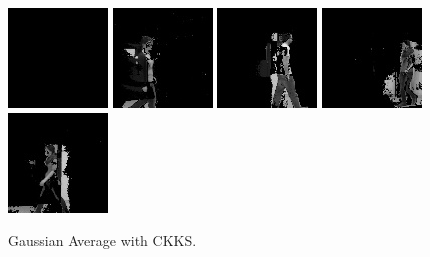     \begin{subfigure}[t]{0.9\textwidth}
        \centering
        \includegraphics[scale=0.7]{figures/LASIESTA-CKKS-GAUSSIAN/frame0}
        \hfill
        \includegraphics[scale=0.7]{figures/LASIESTA-CKKS-GAUSSIAN/frame100}
        \hfill
        \includegraphics[scale=0.7]{figures/LASIESTA-CKKS-GAUSSIAN/frame190}
        \hfill
        \includegraphics[scale=0.7]{figures/LASIESTA-CKKS-GAUSSIAN/frame250}
        \hfill
        \includegraphics[scale=0.7]{figures/LASIESTA-CKKS-GAUSSIAN/frame270}
        \caption{Gaussian Average with CKKS.}
    \end{subfigure}

